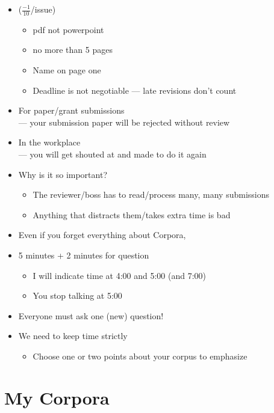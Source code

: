 \documentclass[a4paper,landscape,headrule,footrule,xetex]{foils}
\begin{document}
\begin{itemize}\addtolength{\itemsep}{-1.5ex}
\item {} ($\frac{-1}{10}$/issue)
  \begin{itemize}
  \item pdf not powerpoint
  \item no more than 5 pages
  \item Name on page one
  \item Deadline is not negotiable --- late revisions don't count 
  \end{itemize}
\item For paper/grant submissions 
\\ --- your submission paper will be rejected without review
\item In the workplace
\\ --- you will get shouted at and made to do it again
\item Why is it so important?
  \begin{itemize}
  \item The reviewer/boss has to read/process many, many submissions
  \item Anything that distracts them/takes extra time is bad
  \end{itemize}
\item Even if you forget everything about Corpora, 
\end{itemize}

\MyLogo{}
\begin{itemize}
\item 5 minutes + 2 minutes for question
  \begin{itemize}
  \item I will indicate time at 4:00 and 5:00 (and 7:00)
  \item You  stop talking at 5:00
  \end{itemize}
\item Everyone must ask one (new) question!
\item We need to keep time strictly
  \begin{itemize}
  \item Choose one or two points about your corpus to emphasize
  \end{itemize}
\end{itemize}

\section{My Corpora}
\end{document}
